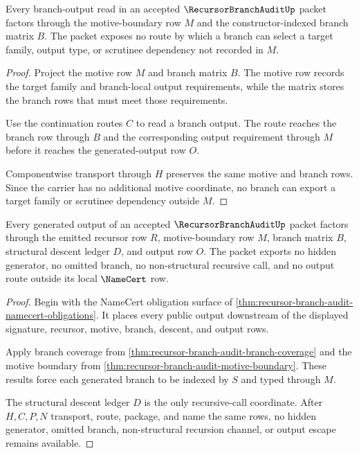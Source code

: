 \begin{theorem}
\label{thm:recursor-branch-audit-motive-boundary}
Every branch-output read in an accepted $\RecursorBranchAuditUp$ packet factors through the motive-boundary row $M$ and the constructor-indexed branch matrix $B$. The packet exposes no route by which a branch can select a target family, output type, or scrutinee dependency not recorded in $M$.
\end{theorem}
\begin{proof}
Project the motive row $M$ and branch matrix $B$. The motive row records the target family and branch-local output requirements, while the matrix stores the branch rows that must meet those requirements.

Use the continuation routes $C$ to read a branch output. The route reaches the branch row through $B$ and the corresponding output requirement through $M$ before it reaches the generated-output row $O$.

Componentwise transport through $H$ preserves the same motive and branch rows. Since the carrier has no additional motive coordinate, no branch can export a target family or scrutinee dependency outside $M$.
\end{proof}

\begin{theorem}
\label{thm:recursor-branch-audit-nonescape}
Every generated output of an accepted $\RecursorBranchAuditUp$ packet factors through the emitted recursor row $R$, motive-boundary row $M$, branch matrix $B$, structural descent ledger $D$, and output row $O$. The packet exports no hidden generator, no omitted branch, no non-structural recursive call, and no output route outside its local $\NameCert$ row.
\end{theorem}
\begin{proof}
Begin with the NameCert obligation surface of \autoref{thm:recursor-branch-audit-namecert-obligations}. It places every public output downstream of the displayed signature, recursor, motive, branch, descent, and output rows.

Apply branch coverage from \autoref{thm:recursor-branch-audit-branch-coverage} and the motive boundary from \autoref{thm:recursor-branch-audit-motive-boundary}. These results force each generated branch to be indexed by $S$ and typed through $M$.

The structural descent ledger $D$ is the only recursive-call coordinate. After $H,C,P,N$ transport, route, package, and name the same rows, no hidden generator, omitted branch, non-structural recursion channel, or output escape remains available.
\end{proof}

